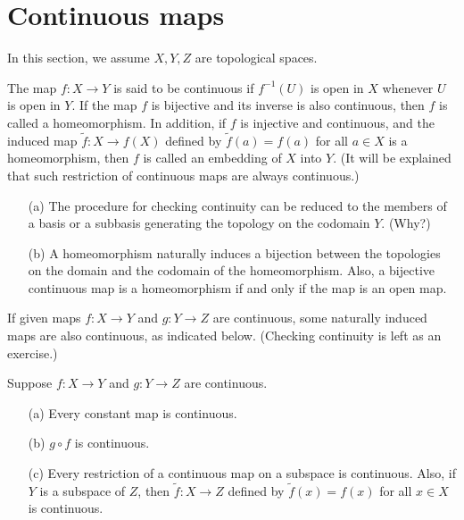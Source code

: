 \section{Continuous maps}

In this section, we assume $X, Y, Z$ are topological spaces.

\begin{defi}[Continuity]
    The map $f: X\rightarrow Y$ is said to be continuous if $f^{-1}(U)$ is open in $X$ whenever $U$ is open in $Y$.
    If the map $f$ is bijective and its inverse is also continuous, then $f$ is called a homeomorphism.
    In addition, if $f$ is injective and continuous, and the induced map $\tilde{f}: X\rightarrow f(X)$ defined by $\tilde{f}(a)=f(a)$ for all $a\in X$ is a homeomorphism, then $f$ is called an embedding of $X$ into $Y$.
    (It will be explained that such restriction of continuous maps are always continuous.)
\end{defi}

\begin{rmk}
    \begin{enumerate}
        \item[(a)]
        {
            The procedure for checking continuity can be reduced to the members of a basis or a subbasis generating the topology on the codomain $Y$. \color{brown}(Why?)\color{black}
        }
        \item[(b)]
        {
            A homeomorphism naturally induces a bijection between the topologies on the domain and the codomain of the homeomorphism. Also, a bijective continuous map is a homeomorphism if and only if the map is an open map.
        }
    \end{enumerate}
\end{rmk}

If given maps $f: X\rightarrow Y$ and $g: Y\rightarrow Z$ are continuous, some naturally induced maps are also continuous, as indicated below. (Checking continuity is left as an exercise.)

\begin{prop}
    Suppose $f: X\rightarrow Y$ and $g: Y\rightarrow Z$ are continuous.
    \begin{enumerate}
        \item[(a)] Every constant map is continuous.
        \item[(b)] $g\circ f$ is continuous.
        \item[(c)] Every restriction of a continuous map on a subspace is continuous. Also, if $Y$ is a subspace of $Z$, then $\tilde{f}: X\rightarrow Z$ defined by $\tilde{f}(x)=f(x)$ for all $x\in X$ is continuous.
    \end{enumerate}
\end{prop}

